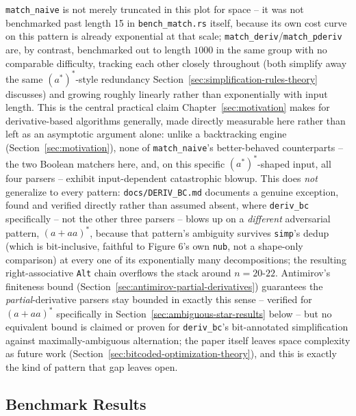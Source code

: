 \texttt{match\_naive} is not merely truncated in this plot for space --
it was not benchmarked past length 15 in \texttt{bench\_match.rs} itself,
because its own cost curve on this pattern is already exponential at
that scale; \texttt{match\_deriv}/\texttt{match\_pderiv} are, by
contrast, benchmarked out to length $1000$ in the same group with no
comparable difficulty, tracking each other closely throughout (both
simplify away the same $(a^{*})^{*}$-style redundancy
Section~\ref{sec:simplification-rules-theory} discusses) and growing
roughly linearly rather than exponentially with input length. This is
the central
practical claim Chapter~\ref{sec:motivation} makes for derivative-based
algorithms generally, made directly measurable here rather than left as
an asymptotic argument alone: unlike a backtracking engine
(Section~\ref{sec:motivation}), none of \texttt{match\_naive}'s
better-behaved counterparts -- the two Boolean matchers here, and, on
this specific $(a^{*})^{*}$-shaped input, all four parsers -- exhibit
input-dependent catastrophic blowup. This does \emph{not} generalize to
every pattern: \texttt{docs/DERIV\_BC.md} documents a genuine exception,
found and verified directly rather than assumed absent, where
\texttt{deriv\_bc} specifically -- not the other three parsers -- blows
up on a \emph{different} adversarial pattern, $(a+aa)^{*}$, because that
pattern's ambiguity survives \texttt{simp}'s dedup (which is bit-inclusive,
faithful to Figure 6's own \texttt{nub}, not a shape-only comparison) at
every one of its exponentially many decompositions; the resulting
right-associative \texttt{Alt} chain overflows the stack around $n=20$-$22$.
Antimirov's finiteness bound
(Section~\ref{sec:antimirov-partial-derivatives}) guarantees the
\emph{partial}-derivative parsers stay bounded in exactly this sense --
verified for $(a+aa)^{*}$ specifically in
Section~\ref{sec:ambiguous-star-results} below -- but no equivalent bound
is claimed or proven for \texttt{deriv\_bc}'s bit-annotated simplification
against maximally-ambiguous alternation; the paper itself leaves space
complexity as future work (Section~\ref{sec:bitcoded-optimization-theory}),
and this is exactly the kind of pattern that gap leaves open.

\subsection{Benchmark Results}
\label{sec:benchmark-results}

